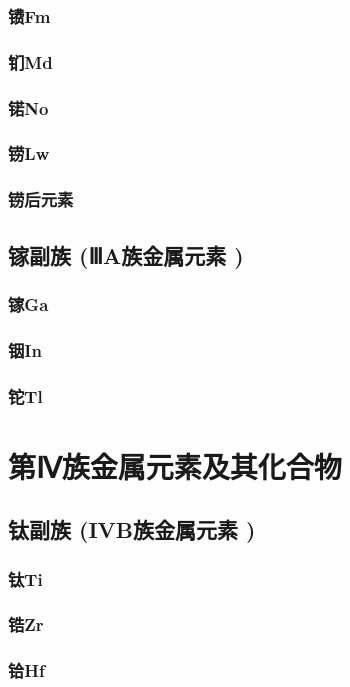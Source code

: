 \documentclass[UTF8]{../03-Chemistry}
\begin{document}
        \subsubsection{镄Fm}
        \subsubsection{钔Md}
        \subsubsection{锘No}
        \subsubsection{铹Lw}
        \subsubsection{铹后元素}
    \subsection{镓副族 (ⅢA族金属元素 )}
        \subsubsection{镓Ga}
        \subsubsection{铟In}
        \subsubsection{铊Tl}

\section{第Ⅳ族金属元素及其化合物}
    \subsection{钛副族 (IVB族金属元素 )}
        \subsubsection{钛Ti}
        \subsubsection{锆Zr}
        \subsubsection{铪Hf}
\end{document}
